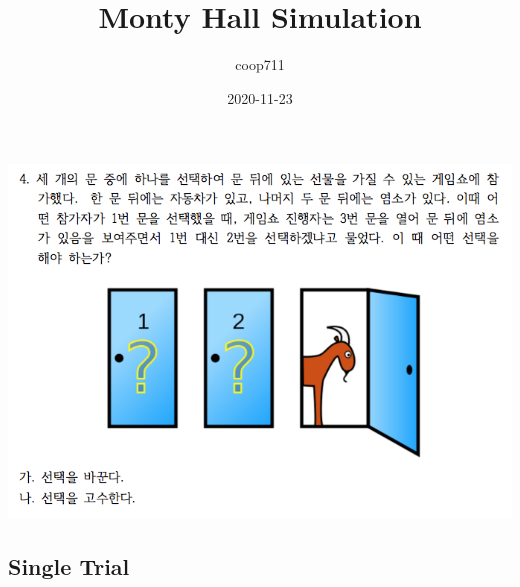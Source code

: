 \documentclass[
]{article}
\title{Monty Hall Simulation}
\author{coop711}
\date{2020-11-23}
\begin{document}
\maketitle

\begin{flushleft}\includegraphics[width=0.65\linewidth]{../pics/Monty_Hall} \end{flushleft}

\hypertarget{single-trial}{%
\subsection{Single Trial}\label{single-trial}}
\end{document}
